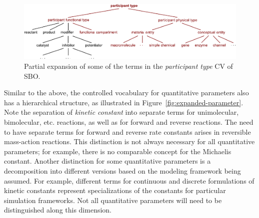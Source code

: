\begin{figure}[htb]
  \vspace*{1ex}
  \centering
  \includegraphics[scale = 0.9]{figs/sbo-participant-type}
  \caption{Partial expansion of some of the terms in the
    \emph{participant type} CV of SBO.}
  \label{fig:expanded-species}
\end{figure}

Similar to the above, the controlled vocabulary for quantitative
parameters also has a hierarchical structure, as illustrated in
Figure~\vref{fig:expanded-parameter}.  Note the separation of
\emph{kinetic constant} into separate terms for unimolecular,
bimolecular, etc. reactions, as well as for forward and
reverse reactions.  The need to have separate terms for forward
and reverse rate constants arises in reversible mass-action
reactions.  This distinction is not always necessary for all
quantitative parameters; for example, there is no comparable
concept for the Michaelis constant.  Another distinction for some
quantitative parameters is a decomposition into different versions
based on the modeling framework being assumed.  For example,
different terms for continuous and discrete formulations of
kinetic constants represent specializations of the constants for
particular simulation frameworks.  Not all quantitative parameters
will need to be distinguished along this dimension.

